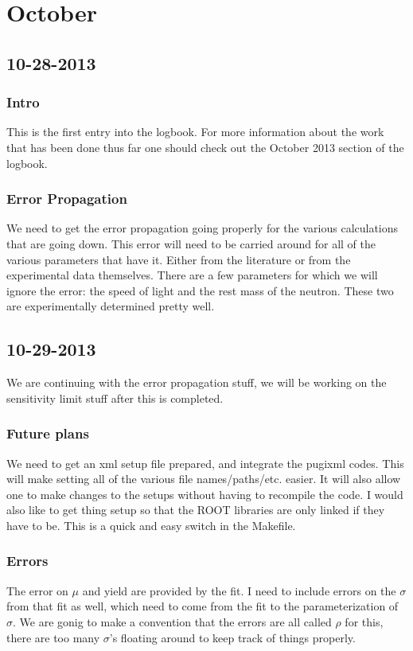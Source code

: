 \chapter{October}
\label{ch:oct}
\section{10-28-2013}
\label{sec:10282013}
\subsection{Intro}
This is the first entry into the logbook. For more information about the work 
that has been done thus far one should check out the October 2013 section of 
the  logbook. 

\subsection{Error Propagation}
We need to get the error propagation going properly for the various 
calculations that are going down. This error will need to be carried around 
for all of the various parameters that have it. Either from the literature or 
from the experimental data themselves. There are a few parameters for which 
we will ignore the error: the speed of light and the rest mass of the neutron. 
These two are experimentally determined pretty well. 

\section{10-29-2013}
\label{sec:10292013}
We are continuing with the error propagation stuff, we will be working on the 
sensitivity limit stuff after this is completed. 

\subsection{Future plans}
We need to get an xml setup file prepared, and integrate the pugixml codes. 
This will make setting all of the various file names/paths/etc. easier. It 
will also allow one to make changes to the setups without having to recompile 
the code. I would also like to get thing setup so that the ROOT libraries are 
only linked if they have to be. This is a quick and easy switch in the Makefile.

\subsection{Errors}
The error on $\mu$ and yield are provided by the fit. I need to include 
errors on the $\sigma$ from that fit as well, which need to come from the 
fit to the parameterization of $\sigma$. We are gonig to make a convention that 
the errors are all called $\rho$ for this, there are too many $\sigma$'s 
floating around to keep track of things properly.


